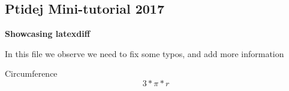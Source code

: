 \documentclass[12pt]{article}
\begin{document}
\begin{flushleft}

\section{Ptidej Mini-tutorial 2017 }

\bf{Showcasing latexdiff}

In this file  we observe we need to fix some typos, and add more information \newline

Circumference
\begin{equation}
	3*\pi*r
\end{equation}



\end{flushleft}
\end{document}
